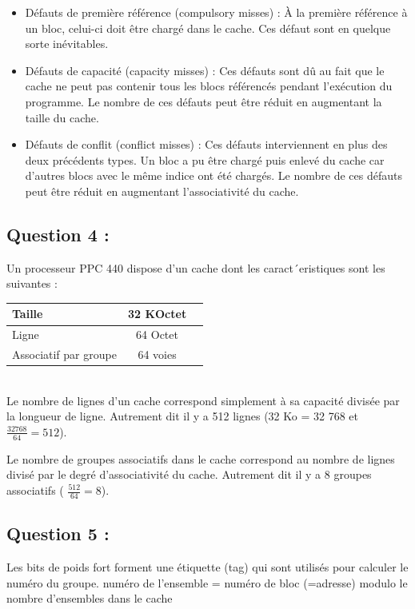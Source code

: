 \documentclass[11pt,a4paper]{article}
\begin{document}
\begin{itemize}
    \item Défauts de première référence (compulsory misses) : À la première référence à un bloc, celui-ci doit être chargé dans le cache. Ces défaut sont en quelque sorte inévitables.
    \item Défauts de capacité (capacity misses) : Ces défauts sont dû au fait que le cache ne peut pas contenir tous les blocs référencés pendant l'exécution du programme. Le nombre de ces défauts peut être réduit en augmentant la taille du cache.
    \item Défauts de conflit (conflict misses) : Ces défauts interviennent en plus des deux précédents types. Un bloc a pu être chargé puis enlevé du cache car d'autres blocs avec le même indice ont été chargés. Le nombre de ces défauts peut être réduit en augmentant l'associativité du cache.
\end{itemize}
    
    \subsection{Question 4 :}

Un processeur PPC 440 dispose d’un cache dont les caract´eristiques sont les suivantes : \\

\begin{center}
    \begin{tabular}{|l|c|r|}
      \hline
      Taille & 32 KOctet \\
      \hline
      Ligne & 64 Octet\\
      Associatif par groupe & 64 voies \\
      \hline
    \end{tabular}
\end{center}
\\

Le nombre de lignes d’un cache correspond simplement à sa capacité divisée par la longueur de ligne. Autrement dit il y a 512 lignes (32 Ko = 32 768 et $ \frac{32768}{64} = 512 $).

Le nombre de groupes associatifs dans le cache correspond au nombre de lignes divisé par le degré d’associativité du cache. Autrement dit il y a 8 groupes associatifs ( $ \frac{512}{64} = 8 $).

    \subsection{Question 5 :}
Les bits de poids fort forment une étiquette (tag) qui sont utilisés pour calculer le numéro du groupe.
numéro de l’ensemble = 
numéro de bloc (=adresse) modulo  le nombre  d’ensembles dans le cache
\end{document}
